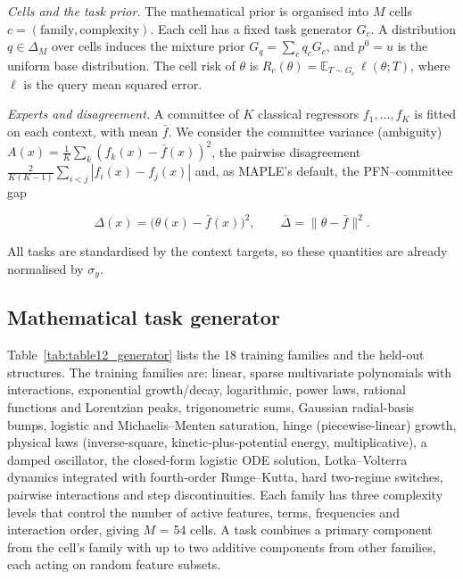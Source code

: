 \documentclass[mathematics,article,submit,pdftex,moreauthors]{Definitions/mdpi}
\begin{document}
\emph{Cells and the task prior.} The mathematical prior is organised into $M$ cells $c=(\text{family},\text{complexity})$. Each cell has a fixed task generator $G_c$. A distribution $q\in\Delta_M$ over cells induces the mixture prior $G_q=\sum_c q_c G_c$, and $p^{0}=u$ is the uniform base distribution. The cell risk of $\theta$ is $R_c(\theta)=\mathbb{E}_{T\sim G_c}\,\ell(\theta;T)$, where $\ell$ is the query mean squared error.

\emph{Experts and disagreement.} A committee of $K$ classical regressors $f_1,\dots,f_K$ is fitted on each context, with mean $\bar f$. We consider the committee variance (ambiguity) $A(x)=\frac1K\sum_k (f_k(x)-\bar f(x))^2$, the pairwise disagreement $\frac{2}{K(K-1)}\sum_{i<j}|f_i(x)-f_j(x)|$ and, as MAPLE's default, the PFN--committee gap

\begin{equation}
\Delta(x)=\bigl(\theta(x)-\bar f(x)\bigr)^{2},\qquad \bar\Delta=\|\theta-\bar f\|^{2}.
\end{equation}

All tasks are standardised by the context targets, so these quantities are already normalised by $\sigma_y$.

\subsection{Mathematical task generator}

Table~\ref{tab:table12_generator} lists the 18 training families and the held-out structures. The training families are: linear, sparse multivariate polynomials with interactions, exponential growth/decay, logarithmic, power laws, rational functions and Lorentzian peaks, trigonometric sums, Gaussian radial-basis bumps, logistic and Michaelis--Menten saturation, hinge (piecewise-linear) growth, physical laws (inverse-square, kinetic-plus-potential energy, multiplicative), a damped oscillator, the closed-form logistic ODE solution, Lotka--Volterra dynamics \cite{volterra1926fluctuations} integrated with fourth-order Runge--Kutta, hard two-regime switches, pairwise interactions and step discontinuities. Each family has three complexity levels that control the number of active features, terms, frequencies and interaction order, giving $M$ = 54 cells. A task combines a primary component from the cell's family with up to two additive components from other families, each acting on random feature subsets.


\end{document}
